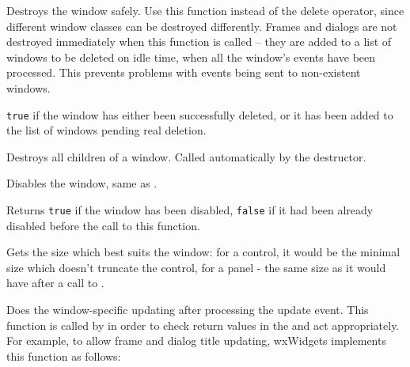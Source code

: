\label{wxwindowdestroy}


Destroys the window safely. Use this function instead of the delete operator, since
different window classes can be destroyed differently. Frames and dialogs
are not destroyed immediately when this function is called -- they are added
to a list of windows to be deleted on idle time, when all the window's events
have been processed. This prevents problems with events being sent to non-existent
windows.


{\tt true} if the window has either been successfully deleted, or it has been added
to the list of windows pending real deletion.


\label{wxwindowdestroychildren}


Destroys all children of a window.  Called automatically by the destructor.


\label{wxwindowdisable}


Disables the window, same as .


Returns {\tt true} if the window has been disabled, {\tt false} if it had been
already disabled before the call to this function.


\label{wxwindowdogetbestsize}


Gets the size which best suits the window: for a control, it would be
the minimal size which doesn't truncate the control, for a panel - the
same size as it would have after a call to .


\label{wxwindowdoupdatewindowui}


Does the window-specific updating after processing the update event.
This function is called by 
in order to check return values in the  and
act appropriately. For example, to allow frame and dialog title updating, wxWidgets
implements this function as follows:


